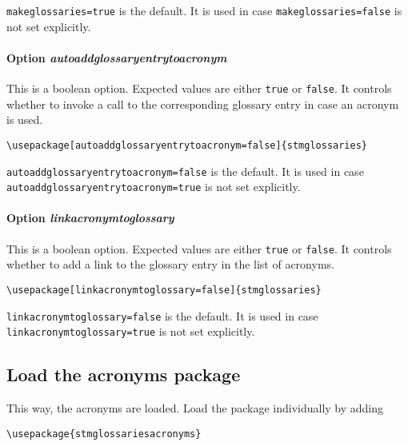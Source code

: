 \documentclass[%
  type=article,%
  layout=koma,%
  hyperref=true,%
  conditionallox=true,%
  conditionalloxnewpage=false,%
  date=true,%
  index=true,%
  listings=true%
]{stmtext}
\begin{document}
\texttt{makeglossaries=true} is the default. It is used in case \texttt{makeglossaries=false} is not set explicitly.

\paragraph{Option \protect\textit{autoaddglossaryentrytoacronym}}
\label{sec:usage:preamble:wholepackage:options:autoaddglossaryentrytoacronym}

This is a boolean option. Expected values are either \texttt{true} or \texttt{false}. It controls whether to invoke a call to the corresponding glossary entry in case an acronym is used. 

\begin{verbatim}
\usepackage[autoaddglossaryentrytoacronym=false]{stmglossaries}
\end{verbatim}

\texttt{autoaddglossaryentrytoacronym=false} is the default. It is used in case \texttt{autoaddglossaryentrytoacronym=true} is not set explicitly.

\paragraph{Option \protect\textit{linkacronymtoglossary}}
\label{sec:usage:preamble:wholepackage:options:linkacronymtoglossary}

This is a boolean option. Expected values are either \texttt{true} or \texttt{false}. It controls whether to add a link to the glossary entry in the list of acronyms. 

\begin{verbatim}
\usepackage[linkacronymtoglossary=false]{stmglossaries}
\end{verbatim}

\texttt{linkacronymtoglossary=false} is the default. It is used in case \texttt{linkacronymtoglossary=true} is not set explicitly.

\subsection{Load the acronyms package}
\label{sec:usage:preamble:acronymspackage}

This way, the acronyms are loaded. Load the package individually by adding

\begin{verbatim}
\usepackage{stmglossariesacronyms}
\end{verbatim}
\end{document}
